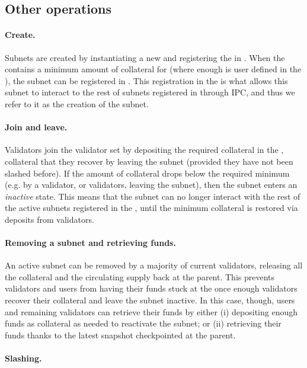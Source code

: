 \subsection{Other operations} 
\paragraph{Create.} Subnets are created by instantiating a new \sa and registering the \sa in \gw. When the \gw contains a minimum amount of collateral for \sa (where enough is user defined in the \sa {}), the subnet can be registered in \gw. This registration in the \gw is what allows this subnet to interact to the rest of subnets registered in \gw through IPC, and thus we refer to it as the creation of the subnet. 
\paragraph{Join and leave.} Validators join the validator set by depositing the required collateral in the \gw, collateral that they recover by leaving the subnet (provided they have not been slashed before). If the amount of collateral drops below the required minimum (e.g. by a validator, or validators, leaving the subnet), then the subnet enters an \emph{inactive} state. This means that the subnet can no longer interact with the rest of the active subnets registered in the \gw, until the minimum collateral is restored via deposits from validators.
\paragraph{Removing a subnet and retrieving funds.} An active subnet can be removed by a majority of current validators, releasing all the collateral and the circulating supply back at the parent. This prevents validators and users from having their funds stuck at the \gw once enough validators recover their collateral and leave the subnet inactive. In this case, though, users and remaining validators can retrieve their funds by either (i) depositing enough funds as collateral as needed to reactivate the subnet; or (ii) retrieving their funds thanks to the latest snapshot checkpointed at the parent. 
\paragraph{Slashing.}

